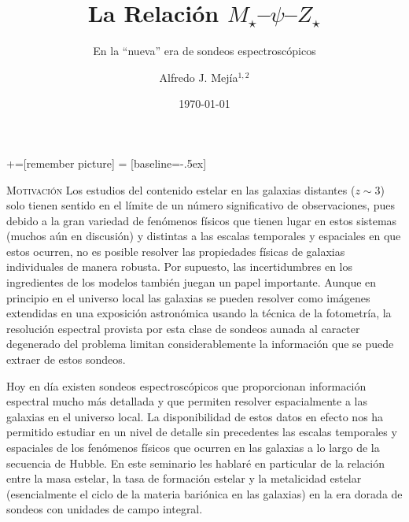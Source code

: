 \documentclass[xcolor=dvipsnames,4pt,hyperref={colorlinks,citecolor=black,linkcolor=black,urlcolor=black}]{beamer}
\begin{document}
+=[remember picture]
 = [baseline=-.5ex]

\begin{frame}
\title{La Relación $M_\star$--$\psi$--$Z_\star$}
\subtitle{En la ``nueva'' era de sondeos espectroscópicos}
\author{Alfredo J. Mej\'ia$^{1,2}$}

\date{\today}


\maketitle
\end{frame}

\begin{frame}[allowframebreaks]{\textsc{Motivación}}
%
Los estudios del contenido estelar en las galaxias distantes ($z\sim3$) solo tienen sentido en el
límite de un número significativo de observaciones, pues debido a la gran variedad de fenómenos
físicos que tienen lugar en estos sistemas (muchos aún en discusión) y distintas a las escalas
temporales y espaciales en que estos ocurren, no es posible resolver las propiedades físicas de
galaxias individuales de manera robusta. Por supuesto, las incertidumbres en los ingredientes de los
modelos también juegan un papel importante. Aunque en principio en el universo local las galaxias se
pueden resolver como imágenes extendidas en una exposición astronómica usando la técnica de la
fotometría, la resolución espectral provista por esta clase de sondeos aunada al caracter degenerado
del problema limitan considerablemente la información que se puede extraer de estos sondeos.

Hoy en día existen sondeos espectroscópicos que proporcionan información espectral mucho más
detallada y que permiten resolver espacialmente a las galaxias en el universo local. La
disponibilidad de estos datos en efecto nos ha permitido estudiar en un nivel de detalle sin
precedentes las escalas temporales y espaciales de los fenómenos físicos que ocurren en las galaxias
a lo largo de la secuencia de Hubble. En este seminario les hablaré en particular de la relación
entre la masa estelar, la tasa de formación estelar y la metalicidad estelar (esencialmente el ciclo
de la materia bariónica en las galaxias) en la era dorada de sondeos con unidades de campo integral.
%
\end{frame}
\end{document}
